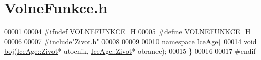 \hypertarget{VolneFunkce_8h_source}{}\section{Volne\+Funkce.\+h}
\label{VolneFunkce_8h_source}

\begin{DoxyCode}
00001 
00004 \textcolor{preprocessor}{#ifndef VOLNEFUNKCE\_H}
00005 \textcolor{preprocessor}{#define VOLNEFUNKCE\_H}
00006 
00007 \textcolor{preprocessor}{#include"\hyperlink{Zivot_8h}{Zivot.h}"}
00008 
00009 
00010 \textcolor{keyword}{namespace }\hyperlink{namespaceIceAge}{IceAge}\{
00014     \textcolor{keywordtype}{void} \hyperlink{namespaceIceAge_a2c6b97286bcd54e3ecf2fdc335460e90}{boj}(\hyperlink{classIceAge_1_1Zivot}{IceAge::Zivot}* utocnik, \hyperlink{classIceAge_1_1Zivot}{IceAge::Zivot}* obrance);
00015 \}
00016 
00017 \textcolor{preprocessor}{#endif}
\end{DoxyCode}
